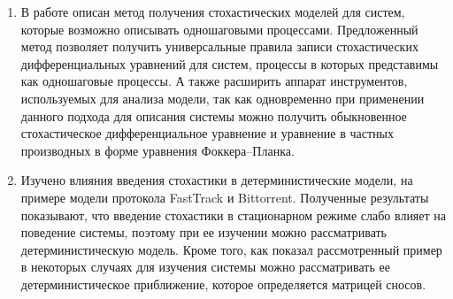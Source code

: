 \documentclass[floatfix,
showkeys,
twocolumn, nofootinbib, superscriptaddress, ]{revtex4-1}
\begin{document}
\begin{enumerate}
\item В работе описан метод получения стохастических моделей для
  систем, которые возможно описывать одношаговыми
  процессами. Предложенный метод позволяет получить универсальные
  правила записи стохастических дифференциальных уравнений для систем,
  процессы в которых представимы как одношаговые процессы. А также
  расширить аппарат инструментов, используемых для анализа модели, так
  как одновременно при применении данного подхода для описания системы
  можно получить обыкновенное стохастическое дифференциальное
  уравнение и уравнение в частных производных в форме уравнения
  Фоккера--Планка.
\item Изучено влияния введения стохастики в детерминистические модели,
  на примере модели протокола FastTrack и Bittorrent. Полученные
  результаты показывают, что введение стохастики в стационарном режиме
  слабо влияет на поведение системы, поэтому при ее изучении можно
  рассматривать детерминистическую модель. Кроме того, как показал
  рассмотренный пример в некоторых случаях для изучения системы можно
  рассматривать ее детерминистическое приближение, которое
  определяется матрицей сносов.
\end{enumerate}





\end{document}
